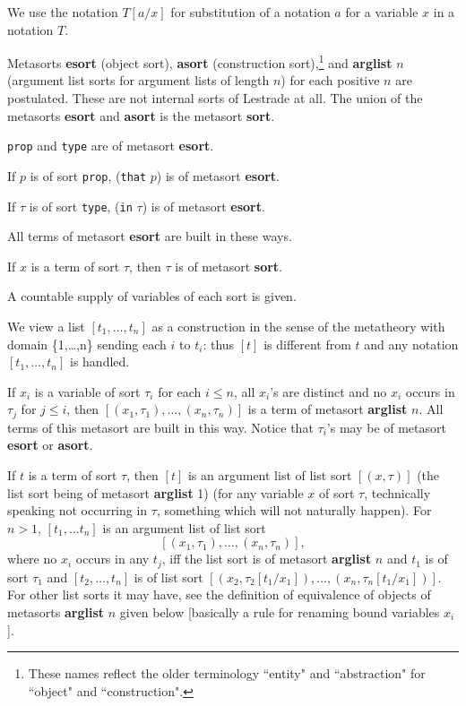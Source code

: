 \documentclass[12pt]{article}
\begin{document}
We use the notation $T[a/x]$  for substitution of a notation $a$ for a variable $x$ in a notation $T$.

Metasorts {\bf esort} (object sort), {\bf asort} (construction sort),\footnote{These names reflect the older terminology ``entity" and ``abstraction" for ``object" and ``construction".} and {\bf arglist} $n$ (argument list sorts for argument lists of length $n$) for each positive $n$
are postulated.  These are not internal sorts of Lestrade at all.  The union of the metasorts {\bf esort} and {\bf asort} is the metasort {\bf sort}.

{\tt prop} and {\tt type} are of metasort {\bf esort}.

If $p$ is of sort {\tt prop},  ({\tt that} $p$) is of metasort {\bf esort}.

If $\tau$ is of sort {\tt type}, ({\tt in} $\tau$) is of metasort {\bf esort}.

All terms of metasort {\bf esort} are built in these ways.

If $x$ is a term of sort $\tau$, then $\tau$ is of metasort {\bf sort}.

A countable supply of variables of each sort is given.

We view a list $[t_1,\ldots,t_n]$ as a construction in the sense of the metatheory with domain \{1,\ldots,n\} sending each $i$ to $t_i$:  thus
$[t]$ is different from $t$ and any notation $[t_1,\ldots,t_n]$ is handled.

If $x_i$ is a variable of sort $\tau_i$ for each $i \leq n$, all $x_i$'s are distinct and no $x_i$ occurs in $\tau_j$ for $j\leq i$, then
$[(x_1,\tau_1),\ldots,(x_n,\tau_n)]$ is a term of metasort {\bf arglist} $n$.  All terms of this metasort are built in this way.  Notice
that $\tau_i$'s may be of metasort {\bf esort} or {\bf asort}.

If $t$ is a term of sort $\tau$, then $[t]$ is an argument list of list sort $[(x,\tau)]$ (the list sort being of metasort {\bf arglist} 1) (for any variable $x$ of sort $\tau$, technically speaking not occurring in $\tau$, something which will not naturally happen).  For $n>1$,  $[t_1,\ldots t_n]$ is an argument list of list sort $$[(x_1,\tau_1),\ldots,(x_n,\tau_n)],$$ where no $x_i$ occurs in any $t_j$, iff  the list sort is of metasort {\bf arglist} $n$ and
$t_1$ is of sort $\tau_1$ and $[t_2,\ldots,t_n]$ is of list sort $[(x_2,\tau_2[t_1/x_1]),\ldots,(x_n,\tau_n[t_1/x_1])]$.  For other list sorts it may have, see the definition of equivalence
of objects of metasorts {\bf arglist} $n$ given below [basically a rule for renaming bound variables $x_i$].
\end{document}
